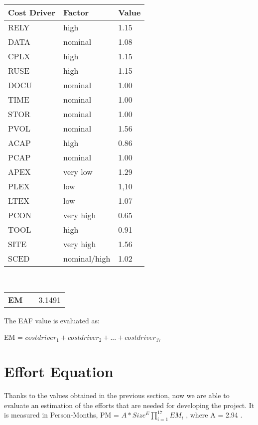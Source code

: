\begin{center}
  \begin{tabular}{ l | l | l }%
   	\hline
	\textbf{Cost Driver} & \textbf{Factor} & \textbf{Value}
   	\\ \hline
    RELY & high & 1.15
    \\\hline
    DATA & nominal & 1.08
    \\\hline
    CPLX & high & 1.15
    \\\hline
    RUSE &  high & 1.15
 	\\\hline
 	DOCU  & nominal & 1.00
   	\\\hline 
    TIME  & nominal & 1.00
   	\\\hline 
   	STOR  & nominal & 1.00
   	\\\hline 
   	PVOL  & nominal & 1.56
   	\\\hline 
   	ACAP  & high & 0.86
   	\\\hline 
   	PCAP  & nominal & 1.00
   	\\\hline 
   	APEX  & very low & 1.29
   	\\\hline 
   	PLEX  & low & 1,10
   	\\\hline 
   	LTEX  & low & 1.07
   	\\\hline 
   	PCON  & very high & 0.65
   	\\\hline 
   	TOOL  & high & 0.91
   	\\\hline 
   	SITE  & very high & 1.56
   	\\\hline 
   	SCED  & nominal/high & 1.02
   	\\\hline 
  \end{tabular}
  \\\begin{tabular}{ l l | l }%
   	\\\textbf{EM} & & 3.1491
  \end{tabular}
\end{center}

The EAF value is evaluated as: 
\\\begin{center}EM = $cost driver_1 + cost driver_2 + ... + cost driver_{17}$ \end{center}

\section{Effort Equation}
Thanks to the values obtained in the previous section, now we are able to evaluate an estimation of the efforts that are needed for developing the project. It is measured in Person-Months, PM = $A * Size^E \prod_{i=1}^{17} EM_i$ 	, where A = 2.94 .

